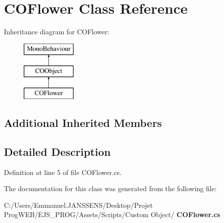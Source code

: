 \section{C\+O\+Flower Class Reference}
\label{class_c_o_flower}
Inheritance diagram for C\+O\+Flower\+:\begin{figure}[H]
\begin{center}
\leavevmode
\includegraphics[height=3.000000cm]{class_c_o_flower}
\end{center}
\end{figure}
\subsection*{Additional Inherited Members}


\subsection{Detailed Description}


Definition at line 5 of file C\+O\+Flower.\+cs.



The documentation for this class was generated from the following file\+:\begin{DoxyCompactItemize}
\item 
C\+:/\+Users/\+Emmanuel.\+J\+A\+N\+S\+S\+E\+N\+S/\+Desktop/\+Projet Prog\+W\+E\+B/\+E\+J\+S\+\_\+\+P\+R\+O\+G/\+Assets/\+Scripts/\+Custom Object/\textbf{ C\+O\+Flower.\+cs}\end{DoxyCompactItemize}
